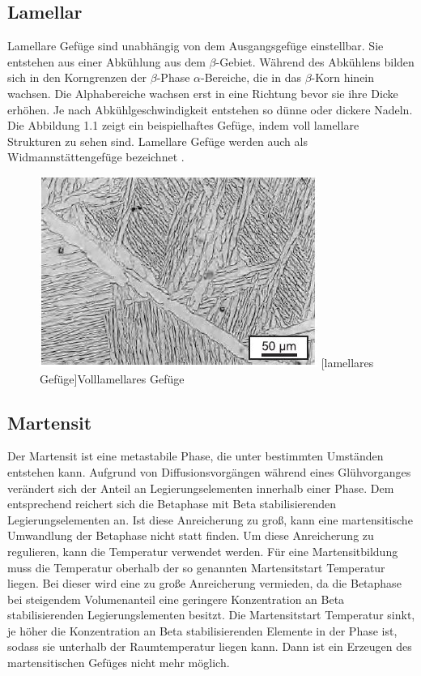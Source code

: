 \documentclass[a4paper, 11pt]{tubsreprt}
\begin{document}
\subsection{Lamellar} \label{section Gefüge Lamellar}
Lamellare Gefüge sind unabhängig von dem Ausgangsgefüge einstellbar. Sie entstehen aus einer Abkühlung aus dem $\beta$-Gebiet. Während des Abkühlens bilden sich in den Korngrenzen der $\beta$-Phase $\alpha$-Bereiche, die in das $\beta$-Korn hinein wachsen. Die Alphabereiche wachsen erst in eine Richtung bevor sie ihre Dicke erhöhen. Je nach Abkühlgeschwindigkeit entstehen so dünne oder dickere Nadeln. Die Abbildung 1.1 zeigt ein beispielhaftes Gefüge, indem voll lamellare Strukturen zu sehen sind. Lamellare Gefüge werden auch als Widmannstättengefüge bezeichnet \cite{Luetjering2007}.


\begin{figure}
	\centering
		\includegraphics[scale=1]{Bilder/lamellar.jpg}
		[lamellares Gefüge]{Volllamellares Gefüge \cite{Leyens2002}}
		\label{lamellar}
		
\end{figure}
\subsection{Martensit}
Der Martensit ist eine metastabile Phase, die unter bestimmten Umständen entstehen kann. Aufgrund von Diffusionsvorgängen während eines Glühvorganges verändert sich der Anteil an Legierungselementen innerhalb einer Phase. Dem entsprechend reichert sich die Betaphase mit Beta stabilisierenden Legierungselementen an. Ist diese Anreicherung zu groß, kann eine martensitische Umwandlung der Betaphase nicht statt finden. Um diese Anreicherung zu regulieren, kann die Temperatur verwendet werden. Für eine Martensitbildung muss die Temperatur oberhalb der so genannten Martensitstart Temperatur liegen. Bei dieser wird eine zu große Anreicherung vermieden, da die Betaphase bei steigendem Volumenanteil eine geringere Konzentration an Beta stabilisierenden Legierungslementen besitzt. Die Martensitstart Temperatur sinkt, je höher die Konzentration an Beta stabilisierenden Elemente in der Phase ist, sodass sie unterhalb der Raumtemperatur liegen kann. Dann ist ein Erzeugen des martensitischen Gefüges nicht mehr möglich.
\end{document}
